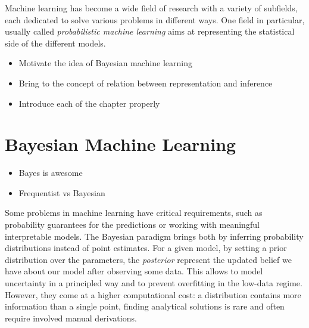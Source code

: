 
\ifpdf
    \graphicspath{{1_introduction/figures/PNG/}{1_introduction/figures/PDF/}{1_introduction/figures/}}
\else
    \graphicspath{{1_introduction/figures/EPS/}{1_introduction/figures/}}
\fi


Machine learning has become a wide field of research with a variety of subfields, each dedicated to solve various problems in different ways.
One field in particular, usually called \textit{probabilistic machine learning} aims at representing the statistical side of the different models.

\begin{itemize}
    \item Motivate the idea of Bayesian machine learning
    \item Bring to the concept of relation between representation and inference
    \item Introduce each of the chapter properly
\end{itemize}


\section{Bayesian Machine Learning}

\begin{itemize}
    \item Bayes is awesome
    \item Frequentist vs Bayesian
\end{itemize}

Some problems in machine learning have critical requirements, such as probability guarantees for the predictions or working with meaningful interpretable models.
The Bayesian paradigm brings both by inferring probability distributions instead of point estimates.
For a given model, by setting a prior distribution over the parameters, the \textit{posterior} represent the updated belief we have about our model after observing some data.
This allows to model uncertainty in a principled way and to prevent overfitting in the low-data regime.
However, they come at a higher computational cost: a distribution contains more information than a single point, finding analytical solutions is rare and often require involved manual derivations.

